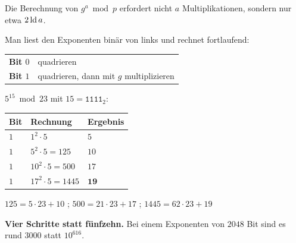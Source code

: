 \begin{merksatz}
Die Berechnung von $g^{a} \bmod p$ erfordert nicht $a$ Multiplikationen, sondern nur etwa $2\operatorname{ld} a$.

Man liest den Exponenten binär von links und rechnet fortlaufend:
\begin{center}
\renewcommand{\arraystretch}{1.5}
\begin{tabular}{@{}P{2.0cm}P{6.6cm}@{}}
\toprule
\textbf{Bit $0$} & quadrieren\\
\textbf{Bit $1$} & quadrieren, dann mit $g$ multiplizieren\\
\bottomrule
\end{tabular}
\end{center}

 $5^{15} \bmod 23$ mit $15 = \texttt{1111}_2$:
\begin{center}
\renewcommand{\arraystretch}{1.46}
\begin{tabular}{@{}P{1.4cm}P{2.6cm}P{2.4cm}@{}}
\toprule
\textbf{Bit} & \textbf{Rechnung} & \textbf{Ergebnis}\\
\midrule
$1$ & $1^2\cdot5$ & $5$\\
$1$ & $5^2\cdot5 = 125$ & $10$\\
$1$ & $10^2\cdot5 = 500$ & $17$\\
$1$ & $17^2\cdot5 = 1445$ & $\mathbf{19}$\\
\bottomrule
\end{tabular}
\end{center}

 $125 = 5\cdot23+10$ \checkmark; $500 = 21\cdot23+17$ \checkmark; $1445 = 62\cdot23+19$ \checkmark

\begin{center}
\begin{minipage}{0.9\textwidth}
\textbf{Vier Schritte statt fünfzehn.} Bei einem Exponenten von $2048$ Bit sind es rund $3000$ statt $10^{616}$.
\end{minipage}
\end{center}

\begin{center}
\begin{minipage}{0.88\textwidth}
\end{minipage}
\end{center}
\end{merksatz}

